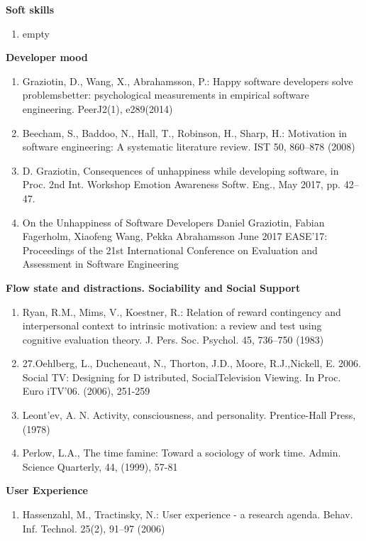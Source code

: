\documentclass[english, 12pt, a4paper, sci, utf8, a-1b, online]{aaltothesis}
\begin{document}
\textbf{Soft skills}
\begin{enumerate}
  \item empty
\end{enumerate}

\textbf{Developer mood}
\begin{enumerate}
  \item Graziotin, D., Wang, X., Abrahamsson, P.: Happy software developers solve problemsbetter: psychological measurements in empirical software engineering. PeerJ2(1), e289(2014)
  \item Beecham, S., Baddoo, N., Hall, T., Robinson, H., Sharp, H.: Motivation in software engineering: A systematic literature review. IST 50, 860–878 (2008)
  \item D. Graziotin, Consequences of unhappiness while developing software, in Proc. 2nd Int. Workshop Emotion Awareness Softw. Eng., May 2017, pp. 42–47.
  \item On the Unhappiness of Software Developers Daniel Graziotin, Fabian Fagerholm, Xiaofeng Wang, Pekka Abrahamsson June 2017 EASE'17: Proceedings of the 21st International Conference on Evaluation and Assessment in Software Engineering
\end{enumerate}

\textbf{Flow state and distractions. Sociability and Social Support}
\begin{enumerate}
  \item Ryan, R.M., Mims, V., Koestner, R.: Relation of reward contingency and interpersonal context to intrinsic motivation: a review and test using cognitive evaluation theory. J. Pers. Soc. Psychol. 45, 736–750 (1983)
  \item 27.Oehlberg,  L.,  Ducheneaut,  N.,  Thorton,  J.D.,  Moore,  R.J.,Nickell,  E.  2006.  Social  TV:  Designing  for  D istributed,  SocialTelevision Viewing. In Proc. Euro iTV’06. (2006), 251-259
  \item Leont’ev,  A.  N.  Activity,  consciousness,  and  personality.  Prentice-Hall Press, (1978)
  \item Perlow, L.A., The time famine: Toward a sociology of work time. Admin. Science Quarterly, 44, (1999), 57-81
\end{enumerate}

\textbf{User Experience}
\begin{enumerate}
  \item Hassenzahl, M., Tractinsky, N.: User experience - a research agenda. Behav. Inf. Technol. 25(2), 91–97 (2006)
\end{enumerate}
\end{document}

